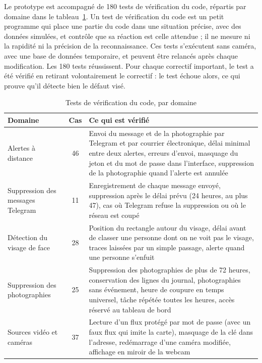 \begin{maj}
Le prototype est accompagné de 180 tests de vérification du code, répartis par domaine dans le tableau~\ref{tab:tests}. Un test de vérification du code est un petit programme qui place une partie du code dans une situation précise, avec des données simulées, et contrôle que sa réaction est celle attendue ; il ne mesure ni la rapidité ni la précision de la reconnaissance. Ces tests s'exécutent sans caméra, avec une base de données temporaire, et peuvent être relancés après chaque modification. Les 180 tests réussissent. Pour chaque correctif important, le test a été vérifié en retirant volontairement le correctif : le test échoue alors, ce qui prouve qu'il détecte bien le défaut visé.
\end{maj}

\begin{table}[H]
\centering
\caption{Tests de vérification du code, par domaine\majmark}\label{tab:tests}
\small
\begin{tabularx}{\textwidth}{@{}>{\raggedright\arraybackslash}p{3.9cm}c>{\raggedright\arraybackslash}X@{}}
\toprule
\textbf{Domaine} & \textbf{Cas} & \textbf{Ce qui est vérifié} \\
\midrule
Alertes à distance & 46 & Envoi du message et de la photographie par Telegram et par courrier électronique, délai minimal entre deux alertes, erreurs d'envoi, masquage du jeton et du mot de passe dans l'interface, suppression de la photographie quand l'alerte est annulée \\
Suppression des messages Telegram & 11 & Enregistrement de chaque message envoyé, suppression après le délai prévu (24 heures, au plus 47), cas où Telegram refuse la suppression ou où le réseau est coupé \\
Détection du visage de face & 28 & Position du rectangle autour du visage, délai avant de classer une personne dont on ne voit pas le visage, traces laissées par un simple passage, alerte quand une personne s'enfuit \\
Suppression des photographies & 25 & Suppression des photographies de plus de 72 heures, conservation des lignes du journal, photographies sans événement, heure de coupure en temps universel, tâche répétée toutes les heures, accès réservé au tableau de bord \\
Sources vidéo et caméras & 37 & Lecture d'un flux protégé par mot de passe (avec un faux flux qui imite la carte), masquage de la clé dans l'adresse, redémarrage d'une caméra modifiée, affichage en miroir de la webcam \\

\end{tabularx}
\end{table}
